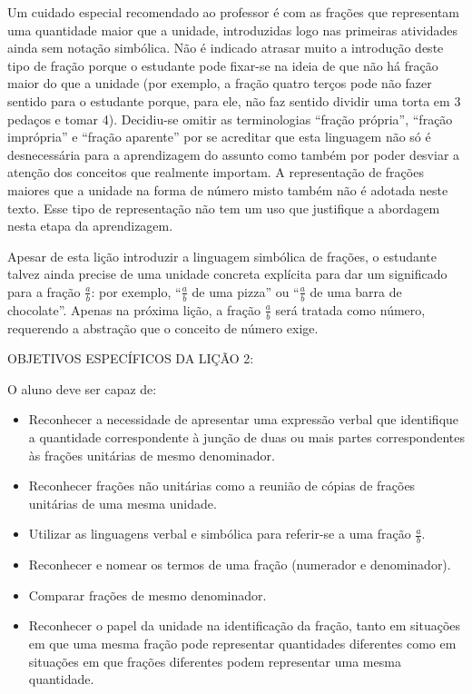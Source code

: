 Um cuidado especial recomendado ao professor é com as frações que representam uma quantidade maior que a unidade, introduzidas logo nas primeiras atividades ainda sem notação simbólica. Não é indicado atrasar muito a introdução deste tipo de fração porque o estudante pode fixar-se na ideia de que não há fração maior do que a unidade  (por exemplo, a fração quatro terços pode não fazer sentido para o estudante porque, para ele, não faz sentido dividir uma torta em 3 pedaços e tomar 4). Decidiu-se omitir as terminologias ``fração própria'', ``fração imprópria'' e ``fração aparente'' por se acreditar que esta linguagem não só é desnecessária para a aprendizagem do assunto como também por poder desviar a atenção dos conceitos que realmente importam.
A representação de frações maiores que a unidade na forma de número misto também não é adotada neste texto. Esse tipo de representação não tem um uso que justifique a abordagem nesta etapa da aprendizagem.

Apesar de esta lição introduzir a linguagem simbólica de frações, o estudante talvez ainda precise de uma unidade concreta explícita para dar um significado para a fração $\frac{a}{b}$: por exemplo, ``$\frac{a}{b}$ de uma pizza'' ou ``$\frac{a}{b}$ de uma barra de chocolate''. Apenas na próxima lição, a fração $\frac{a}{b}$ será tratada como número, requerendo a abstração que o conceito de número exige.
\vspace{.15cm}

\noindent OBJETIVOS ESPECÍFICOS DA LIÇÃO 2:
\vspace{.15cm}

\noindent O aluno deve ser capaz de:
\begin{itemize}
 \item  Reconhecer a necessidade de apresentar uma expressão verbal que identifique a quantidade correspondente à junção de duas ou mais partes correspondentes às frações unitárias de mesmo denominador.
 \item  Reconhecer frações não unitárias como a reunião de cópias de frações unitárias de uma mesma unidade. 
 \item  Utilizar as linguagens verbal e simbólica para referir-se a uma fração $\frac{a}{b}$.
 \item  Reconhecer e nomear os termos de uma fração (numerador e denominador). 
 \item  Comparar frações de mesmo denominador.
 \item Reconhecer o papel da unidade na identificação da fração, tanto em situações em  que uma mesma fração pode representar quantidades diferentes como em situações em que frações diferentes podem representar uma mesma quantidade.
\end{itemize}


